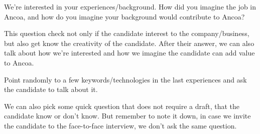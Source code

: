 \documentclass{exam}%
\newcommand*{\ANCOACPP}{}%
\begin{document}
\begin{questions}
\question We're interested in your experiences/background. How did you imagine the job in Ancoa, and how do you imagine your background would contribute to Ancoa?
\begin{solution}[.2in]
	This question check not only if the candidate interest to the company/business, but also get know the creativity of the candidate. After their answer, we can also talk about how we're interested and how we imagine the candidate can add value to Ancoa.
\end{solution}

\question Point randomly to a few keywords/technologies in the last experiences and ask the candidate to talk about it.

We can also pick some quick question that does not require a draft, that the candidate know or don't know. But remember to note it down, in case we invite the candidate to the face-to-face interview, we don't ask the same question.
\end{questions}
\fi

\ifdefined\ANCOACPP
\end{document}
